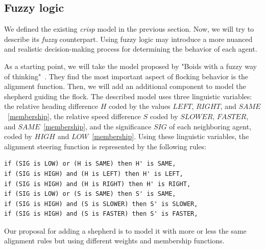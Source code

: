 \documentclass[9pt]{pnas-new}
\begin{document}


\subsection{Fuzzy logic}
We defined the existing \textit{crisp} model in the previous section. Now, we will try to describe its \textit{fuzzy} counterpart. Using fuzzy logic may introduce a more nuanced and realistic decision-making process for determining the behavior of each agent.

As a starting point, we will take the model proposed by "Boids with a fuzzy way of thinking"~\cite{bajec2003boids}. They find the most important aspect of flocking behavior is the alignment function. Then, we will add an additional component to model the shepherd guiding the flock.
The described model uses three linguistic variables: the relative heading difference $H$ coded by the values $LEFT$, $RIGHT$, and $SAME$~\ref{membership}, the relative speed difference $S$ coded by $SLOWER$, $FASTER$, and $SAME$~\ref{membership}, and the significance $SIG$ of each neighboring agent, coded by $HIGH$ and $LOW$~\ref{membership}.
Using these linguistic variables, the alignment steering function is represented by the following rules:
\begin{verbatim}
if (SIG is LOW) or (H is SAME) then H' is SAME,
if (SIG is HIGH) and (H is LEFT) then H' is LEFT,
if (SIG is HIGH) and (H is RIGHT) then H' is RIGHT,
if (SIG is LOW) or (S is SAME) then S' is SAME,
if (SIG is HIGH) and (S is SLOWER) then S' is SLOWER,
if (SIG is HIGH) and (S is FASTER) then S' is FASTER,
\end{verbatim}
Our proposal for adding a shepherd is to model it with more or less the same alignment rules but using different weights and membership functions.
\end{document}
